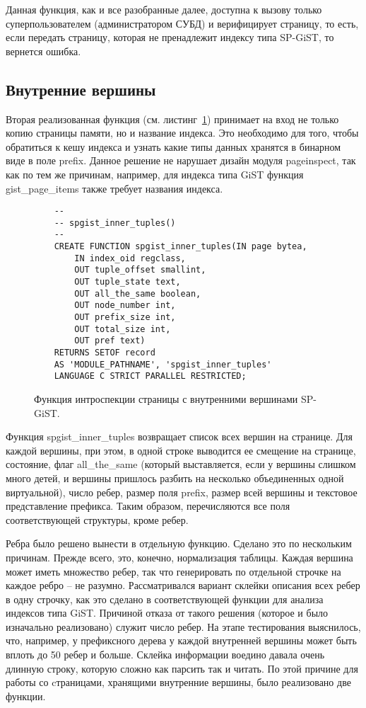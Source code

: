 \documentclass[12pt,oneside]{amsart}
\begin{document}
Данная функция, как и все разобранные далее, доступна к вызову только суперпользователем (администратором СУБД) и верифицирует страницу, то есть, если передать страницу, которая не пренадлежит индексу типа SP-GiST, то вернется ошибка.

\subsection{Внутренние вершины}

Вторая реализованная функция (см. листинг~\ref{my_inner}) принимает на вход не только копию страницы памяти, но и название индекса. Это необходимо для того, чтобы обратиться к кешу индекса и узнать какие типы данных хранятся в бинарном виде в поле prefix. Данное решение не нарушает дизайн модуля pageinspect, так как по тем же причинам, например, для индекса типа GiST функция gist\_page\_items также требует названия индекса.

\begin{figure}[ht]
\begin{lstlisting}
	--
	-- spgist_inner_tuples()
	--
	CREATE FUNCTION spgist_inner_tuples(IN page bytea,
		IN index_oid regclass,
		OUT tuple_offset smallint,
		OUT tuple_state text,
		OUT all_the_same boolean,
		OUT node_number int,
		OUT prefix_size int,
		OUT total_size int,
		OUT pref text)
	RETURNS SETOF record
	AS 'MODULE_PATHNAME', 'spgist_inner_tuples'
	LANGUAGE C STRICT PARALLEL RESTRICTED;
\end{lstlisting}
\caption{Функция интроспекции страницы с внутренними вершинами SP-GiST.}\label{my_inner}
\end{figure}

Функция spgist\_inner\_tuples возвращает список всех вершин на странице. Для каждой вершины, при этом, в одной строке выводится ее смещение на странице, состояние, флаг all\_the\_same (который выставляется, если у вершины слишком много детей, и вершины пришлось разбить на несколько объединенных одной виртуальной), число ребер, размер поля prefix, размер всей вершины и текстовое представление префикса. Таким образом, перечисляются все поля соответствующей структуры, кроме ребер.

Ребра было решено вынести в отдельную функцию. Сделано это по нескольким причинам. Прежде всего, это, конечно, нормализация таблицы. Каждая вершина может иметь множество ребер, так что генерировать по отдельной строчке на каждое ребро -- не разумно. Рассматривался вариант склейки описания всех ребер в одну строчку, как это сделано в соответствующей функции для анализа индексов типа GiST. Причиной отказа от такого решения (которое и было изначально реализовано) служит число ребер. На этапе тестирования выяснилось, что, например, у префиксного дерева у каждой внутренней вершины может быть вплоть до 50 ребер и больше. Склейка информации воедино давала очень длинную строку, которую сложно как парсить так и читать. По этой причине для работы со cтраницами, хранящими внутренние вершины, было реализовано две функции.
\end{document}
